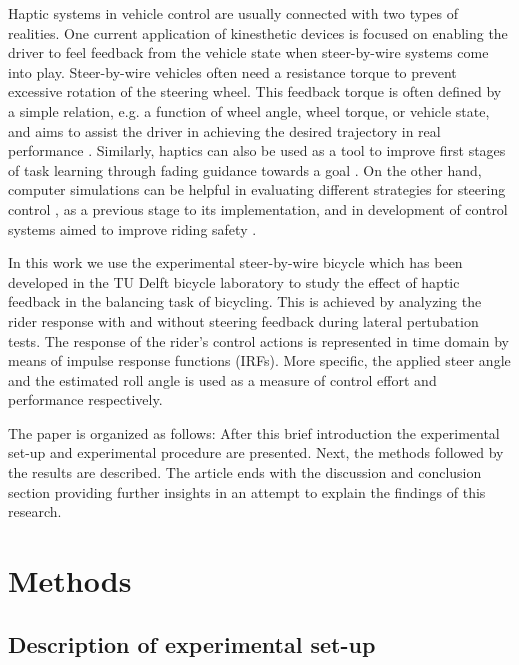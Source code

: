 Haptic systems in vehicle control are usually connected with two types of realities. One current application of kinesthetic devices is focused on enabling the driver to feel feedback from the vehicle state when steer-by-wire systems come into play. Steer-by-wire vehicles often need a resistance torque to prevent excessive rotation of the steering wheel. This feedback torque is often defined by a simple relation, e.g. a function of wheel angle, wheel torque, or vehicle state, and aims to assist the driver in achieving the desired trajectory in real performance \cite{hayama2010resistance}. Similarly, haptics can also be used as a tool to improve first stages of task learning through fading guidance towards a goal \cite{crespo2008haptic}. On the other hand, computer simulations can be helpful in evaluating different strategies for steering control \cite{marumo2007steering}, as a previous stage to its implementation, and in development of control systems aimed to improve riding safety \cite{marumo2011control}.

In this work we use the experimental steer-by-wire bicycle \cite{dialynas2018wire} which has been developed in the TU Delft bicycle laboratory to study the effect of haptic feedback in the balancing task of bicycling. This is achieved by analyzing the rider response with and without steering feedback during lateral pertubation tests. The response of the rider's control actions is represented in time domain by means of impulse response functions (IRFs). More specific, the applied steer angle and the estimated roll angle is used as a measure of control effort and performance respectively.

The paper is organized as follows: After this brief introduction the experimental set-up and  experimental procedure are presented. Next, the methods followed by the results are described. The article ends with the discussion and conclusion section providing further insights in an attempt to explain the findings of this research.


\section{Methods}

\subsection{Description of experimental set-up} 

